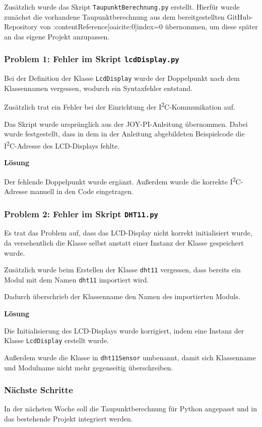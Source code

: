 Zusätzlich wurde das Skript
\texttt{TaupunktBerechnung.py} erstellt.
Hierfür wurde zunächst die vorhandene
Taupunktberechnung aus dem bereitgestellten GitHub-Repository
von :contentReference[oaicite:0]{index=0}
übernommen, um diese später an das eigene Projekt anzupassen.

\subsubsection{Problem 1: Fehler im Skript \texttt{lcdDisplay.py}}

Bei der Definition der Klasse \texttt{LcdDisplay}
wurde der Doppelpunkt nach dem Klassennamen vergessen,
wodurch ein Syntaxfehler entstand.

Zusätzlich trat ein Fehler bei der Einrichtung der
I\textsuperscript{2}C-Kommunikation auf.

Das Skript wurde ursprünglich aus der JOY-PI-Anleitung
übernommen. Dabei wurde festgestellt, dass in dem in der
Anleitung abgebildeten Beispielcode die
I\textsuperscript{2}C-Adresse des LCD-Displays fehlte.

\textbf{Lösung}

Der fehlende Doppelpunkt wurde ergänzt.
Außerdem wurde die korrekte I\textsuperscript{2}C-Adresse
manuell in den Code eingetragen.

\subsubsection{Problem 2: Fehler im Skript \texttt{DHT11.py}}

Es trat das Problem auf, dass das LCD-Display nicht korrekt
initialisiert wurde, da versehentlich die Klasse selbst
anstatt einer Instanz der Klasse gespeichert wurde.

Zusätzlich wurde beim Erstellen der Klasse
\texttt{dht11} vergessen, dass bereits ein Modul mit
dem Namen \texttt{dht11} importiert wird.

Dadurch überschrieb der Klassenname den Namen des
importierten Moduls.

\textbf{Lösung}

Die Initialisierung des LCD-Displays wurde korrigiert,
indem eine Instanz der Klasse \texttt{LcdDisplay}
erstellt wurde.

Außerdem wurde die Klasse in
\texttt{dht11Sensor} umbenannt, damit sich
Klassenname und Modulname nicht mehr gegenseitig
überschreiben.

\subsubsection{Nächste Schritte}

In der nächsten Woche soll die Taupunktberechnung
für Python angepasst und in das bestehende Projekt
integriert werden.